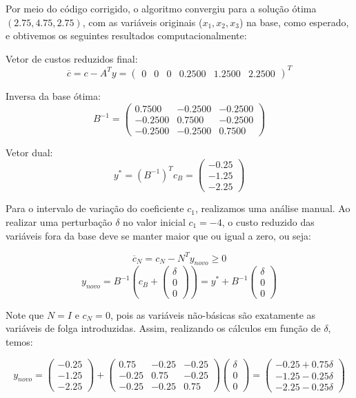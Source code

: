 \documentclass[12pt]{article}
\begin{document}
Por meio do código corrigido, o algoritmo convergiu para a solução ótima $(2.75, 4.75, 2.75)$, com as variáveis originais ($x_1,x_2,x_3$) na base, como esperado, e obtivemos os seguintes resultados computacionalmente:

Vetor de custos reduzidos final:
$$\overline{c}=c - A^Ty=
\begin{pmatrix}
        0 & 0 & 0 & 0.2500 & 1.2500 & 2.2500
\end{pmatrix}^T
$$

Inversa da base ótima:
$$B^{-1}=
\begin{pmatrix}
0.7500 & -0.2500 & -0.2500\\
-0.2500 & 0.7500 & -0.2500\\
-0.2500 & -0.2500 & 0.7500
\end{pmatrix}
$$

Vetor dual:
$$y^*=(B^{-1})^Tc_B=
\begin{pmatrix}
-0.25 \\ -1.25 \\ -2.25
\end{pmatrix}
$$

Para o intervalo de variação do coeficiente $c_1$, realizamos uma análise manual. Ao realizar uma perturbação $\delta$ no valor inicial $c_1=-4$, o custo reduzido das variáveis fora da base deve se manter maior que ou igual a zero, ou seja:

$$\overline{c}_N=c_N-N^Ty_{novo}\geq0$$
$$y_{novo}=B^{-1}\left(c_B+\begin{pmatrix}\delta\\0\\0\end{pmatrix}\right)=y^*+B^{-1}\begin{pmatrix}\delta\\0\\0\end{pmatrix}$$

Note que $N=I$ e $c_N=0$, pois as variáveis não-básicas são exatamente as variáveis de folga introduzidas. Assim, realizando os cálculos em função de $\delta$, temos:

$$y_{novo}=
\begin{pmatrix}
-0.25\\-1.25\\-2.25
\end{pmatrix}
+
\begin{pmatrix}
0.75 & -0.25 & -0.25\\
-0.25 & 0.75 & -0.25\\
-0.25 & -0.25 & 0.75
\end{pmatrix}
\begin{pmatrix}
\delta\\0\\0
\end{pmatrix}
=
\begin{pmatrix}
-0.25+0.75\delta\\-1.25-0.25\delta\\-2.25-0.25\delta
\end{pmatrix}
$$
\end{document}
